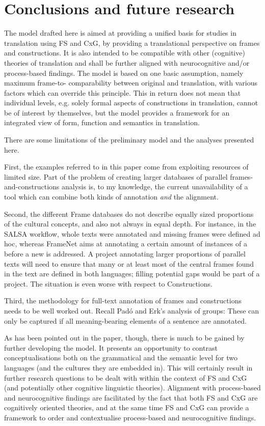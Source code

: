 \documentclass[output=paper]{LSP/langsci}
\begin{document}
\section{Conclusions and future research}\label{czulo:sec:6}
\largerpage[2]
The model drafted here is aimed at providing a unified basis for studies in translation using FS and CxG, by providing a translational perspective on frames and constructions. It is also intended to be compatible with other (cognitive) theories of translation and shall be further aligned with neurocognitive and/or process-based findings. The model is based on one basic assumption, namely maximum frame-to- comparability between original and translation, with various factors which can override this principle. This in return does not mean that individual levels, e.g. solely formal aspects of constructions in translation, cannot be of interest by themselves, but the model provides a framework for an integrated view of form, function and semantics in translation.

There are some limitations of the preliminary model and the analyses presented here. 

First, the examples referred to in this paper come from exploiting resources of limited size. Part of the problem of creating larger databases of parallel frames-and-constructions analysis is, to my knowledge, the current unavailability of a tool which can combine both kinds of annotation \textit{and} the alignment.

Second, the different Frame databases do not describe equally sized proportions of the cultural concepts, and also not always in equal depth. For instance, in the SALSA workflow, whole texts were annotated and missing frames were defined ad hoc, whereas FrameNet aims at annotating a certain amount of instances of a  before a new  is addressed. A project annotating larger proportions of parallel texts will need to ensure that many or at least most of the central frames found in the text are defined in both languages; filling potential gaps would be part of a project. The situation is even worse with respect to Constructions.

Third, the methodology for full-text annotation of frames and constructions needs to be well worked out. Recall Padó and Erk's analysis of  groups: These can only be captured if all meaning-bearing elements of a sentence are annotated.

As has been pointed out in the paper, though, there is much to be gained by further developing the model. It presents an opportunity to contrast conceptualisations both on the grammatical and the semantic level for two languages (and the cultures they are embedded in). This will certainly result in further research questions to be dealt with within the context of FS and CxG (and potentially other cognitive linguistic theories). Alignment with process-based and neurocognitive findings are facilitated by the fact that both FS and CxG are cognitively oriented theories, and at the same time FS and CxG can provide a framework to order and contextualise process-based and neurocognitive findings.

\sloppy
\printbibliography[heading=subbibliography,notkeyword=this]
\end{document}
